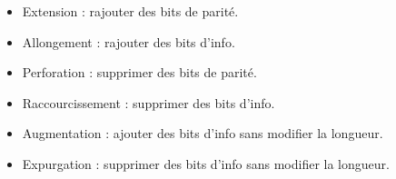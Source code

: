 


	\begin{itemize}
		\item[\textbullet] Extension : rajouter des bits de parité.
		\item[\textbullet] Allongement : rajouter des bits d'info.
		\item[\textbullet] Perforation : supprimer des bits de parité.
		\item[\textbullet] Raccourcissement : supprimer des bits d'info.
		\item[\textbullet] Augmentation : ajouter des bits d'info sans modifier la longueur.
		\item[\textbullet] Expurgation : supprimer des bits d'info sans modifier la longueur.
	\end{itemize}
